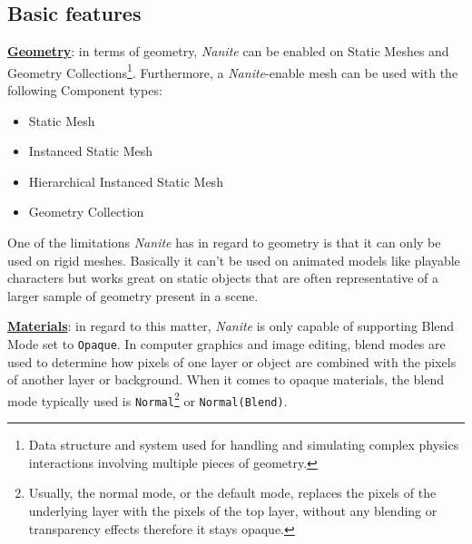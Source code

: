 \documentclass[10pt,journal,compsoc]{IEEEtran}
\begin{document}
\subsection{Basic features}

\par \underline{\textbf{Geometry}}: in terms of geometry, \textit{Nanite} can be enabled on Static Meshes and Geometry Collections\footnote{Data structure and system used for handling and simulating complex physics interactions involving multiple pieces of geometry.}. Furthermore, a \textit{Nanite}-enable mesh can be used with the following Component types:
    \begin{itemize}
        \item Static Mesh 
        \item Instanced Static Mesh
        \item Hierarchical Instanced Static Mesh
        \item Geometry Collection
    \end{itemize}
    
\par One of the limitations \textit{Nanite} has in regard to geometry is that it can only be used on rigid meshes. Basically it can't be used on animated models like playable characters but works great on static objects that are often representative of a larger sample of geometry present in a scene.

\par \underline{\textbf{Materials}}: in regard to this matter, \textit{Nanite} is only capable of supporting Blend Mode set to \texttt{Opaque}. In computer graphics and image editing, blend modes are used to determine how pixels of one layer or object are combined with the pixels of another layer or background. When it comes to opaque materials, the blend mode typically used is \texttt{Normal}\footnote{Usually, the normal mode, or the default mode, replaces the pixels of the underlying layer with the pixels of the top layer, without any blending or transparency effects therefore it stays opaque.} or \texttt{Normal(Blend)}.

\end{document}
